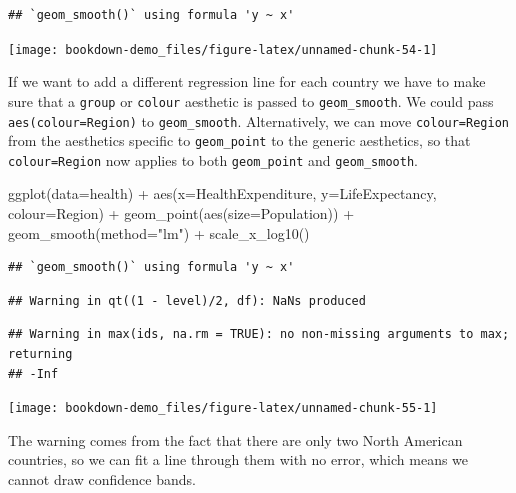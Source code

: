 \documentclass[
]{book}
\newenvironment{Shaded}{\begin{snugshade}}{\end{snugshade}}
\newcommand{\AttributeTok}[1]{\textcolor[rgb]{0.77,0.63,0.00}{#1}}
\newcommand{\FunctionTok}[1]{\textcolor[rgb]{0.00,0.00,0.00}{#1}}
\newcommand{\NormalTok}[1]{#1}
\newcommand{\SpecialCharTok}[1]{\textcolor[rgb]{0.00,0.00,0.00}{#1}}
\newcommand{\StringTok}[1]{\textcolor[rgb]{0.31,0.60,0.02}{#1}}
\begin{document}
\begin{verbatim}
## `geom_smooth()` using formula 'y ~ x'
\end{verbatim}

\texttt{[image: bookdown-demo\_files/figure-latex/unnamed-chunk-54-1]}

If we want to add a different regression line for each country we have to make sure that a \texttt{group} or \texttt{colour} aesthetic is passed to \texttt{geom\_smooth}. We could pass \texttt{aes(colour=Region)} to \texttt{geom\_smooth}. Alternatively, we can move \texttt{colour=Region} from the aesthetics specific to \texttt{geom\_point} to the generic aesthetics, so that \texttt{colour=Region} now applies to both \texttt{geom\_point} and \texttt{geom\_smooth}.

\begin{Shaded}
\begin{Highlighting}[]
\FunctionTok{ggplot}\NormalTok{(}\AttributeTok{data=}\NormalTok{health) }\SpecialCharTok{+} 
    \FunctionTok{aes}\NormalTok{(}\AttributeTok{x=}\NormalTok{HealthExpenditure,  }\AttributeTok{y=}\NormalTok{LifeExpectancy, }\AttributeTok{colour=}\NormalTok{Region) }\SpecialCharTok{+}
    \FunctionTok{geom\_point}\NormalTok{(}\FunctionTok{aes}\NormalTok{(}\AttributeTok{size=}\NormalTok{Population)) }\SpecialCharTok{+}
    \FunctionTok{geom\_smooth}\NormalTok{(}\AttributeTok{method=}\StringTok{"lm"}\NormalTok{)  }\SpecialCharTok{+}
    \FunctionTok{scale\_x\_log10}\NormalTok{()}
\end{Highlighting}
\end{Shaded}

\begin{verbatim}
## `geom_smooth()` using formula 'y ~ x'
\end{verbatim}

\begin{verbatim}
## Warning in qt((1 - level)/2, df): NaNs produced
\end{verbatim}

\begin{verbatim}
## Warning in max(ids, na.rm = TRUE): no non-missing arguments to max; returning
## -Inf
\end{verbatim}

\texttt{[image: bookdown-demo\_files/figure-latex/unnamed-chunk-55-1]}

The warning comes from the fact that there are only two North American countries, so we can fit a line through them with no error, which means we cannot draw confidence bands.
\end{document}
